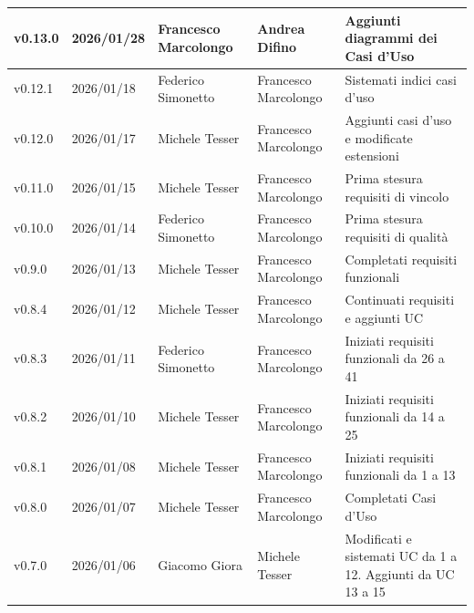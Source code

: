 ﻿\documentclass[a4paper,12pt]{article}
\begin{document}
\begin{center}
\begin{tabularx}{\textwidth}{|l|l|l|X|X|}
        \hline
        v0.13.0            & 2026/01/28          & Francesco Marcolongo & Andrea Difino         & Aggiunti diagrammi dei Casi d'Uso                           \\
        \hline
        v0.12.1            & 2026/01/18          & Federico Simonetto   & Francesco Marcolongo  & Sistemati indici casi d'uso                                 \\
        \hline
        v0.12.0            & 2026/01/17          & Michele Tesser       & Francesco Marcolongo  & Aggiunti casi d'uso e modificate estensioni                 \\
        \hline
        v0.11.0            & 2026/01/15          & Michele Tesser       & Francesco Marcolongo  & Prima stesura requisiti di vincolo                          \\
        \hline
        v0.10.0            & 2026/01/14          & Federico Simonetto   & Francesco Marcolongo  & Prima stesura requisiti di qualità                          \\
        \hline
        v0.9.0             & 2026/01/13          & Michele Tesser       & Francesco Marcolongo  & Completati requisiti funzionali                             \\
        \hline
        v0.8.4             & 2026/01/12          & Michele Tesser       & Francesco Marcolongo  & Continuati requisiti e aggiunti UC                          \\
        \hline
        v0.8.3             & 2026/01/11          & Federico Simonetto   & Francesco Marcolongo  & Iniziati requisiti funzionali da 26 a 41                    \\
        \hline
        v0.8.2             & 2026/01/10          & Michele Tesser       & Francesco Marcolongo  & Iniziati requisiti funzionali da 14 a 25                    \\
        \hline
        v0.8.1             & 2026/01/08          & Michele Tesser       & Francesco Marcolongo  & Iniziati requisiti funzionali da 1 a 13                     \\
        \hline
        v0.8.0             & 2026/01/07          & Michele Tesser       & Francesco Marcolongo  & Completati Casi d'Uso                                       \\
        \hline
        v0.7.0             & 2026/01/06          & Giacomo Giora        & Michele Tesser        & Modificati e sistemati UC da 1 a 12. Aggiunti da UC 13 a 15 \\
        \hline

\end{tabularx}
\end{center}
\end{document}

